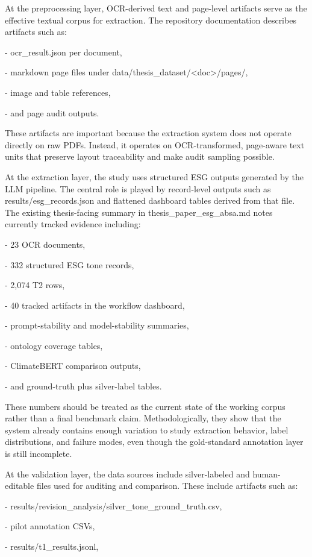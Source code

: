 \documentclass{article}
\begin{document}
At the preprocessing layer, OCR-derived text and page-level artifacts serve as the effective textual corpus for extraction. The repository documentation describes artifacts such as:

- ocr\_result.json per document,

- markdown page files under data/thesis\_dataset/<doc>/pages/,

- image and table references,

- and page audit outputs.

These artifacts are important because the extraction system does not operate directly on raw PDFs. Instead, it operates on OCR-transformed, page-aware text units that preserve layout traceability and make audit sampling possible.

At the extraction layer, the study uses structured ESG outputs generated by the LLM pipeline. The central role is played by record-level outputs such as results/esg\_records.json and flattened dashboard tables derived from that file. The existing thesis-facing summary in thesis\_paper\_esg\_absa.md notes currently tracked evidence including:

- 23 OCR documents,

- 332 structured ESG tone records,

- 2,074 T2 rows,

- 40 tracked artifacts in the workflow dashboard,

- prompt-stability and model-stability summaries,

- ontology coverage tables,

- ClimateBERT comparison outputs,

- and ground-truth plus silver-label tables.

These numbers should be treated as the current state of the working corpus rather than a final benchmark claim. Methodologically, they show that the system already contains enough variation to study extraction behavior, label distributions, and failure modes, even though the gold-standard annotation layer is still incomplete.

At the validation layer, the data sources include silver-labeled and human-editable files used for auditing and comparison. These include artifacts such as:

- results/revision\_analysis/silver\_tone\_ground\_truth.csv,

- pilot annotation CSVs,

- results/t1\_results.jsonl,
\end{document}
